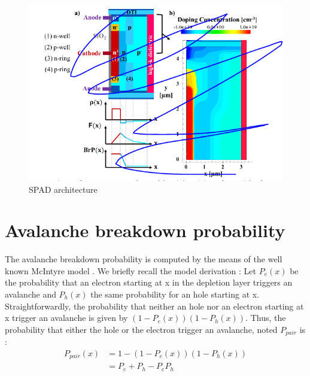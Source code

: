 \documentclass[10pt,a4paper,twocolumn]{article}
\begin{document}
\begin{figure}[hbtp]
\centering
\includegraphics[scale=0.80]{../pictures/SPAD_Archi.png}
\caption{SPAD architecture}
\end{figure}

\section{Avalanche breakdown probability}
The avalanche breakdown probability is computed by the means of the well known McIntyre model \cite{oldham_triggering_1972}. We briefly recall the model derivation : 
Let $P_e(x)$ be the probability that an electron starting at x in the depletion layer triggers an avalanche and $P_h(x)$ the same probability for an hole starting at x.
Straightforwardly, the probability that neither an hole nor an electron starting at x trigger an avalanche is given by $(1-P_e(x))(1-P_h(x))$.
Thus, the probability that either the hole or the electron trigger an avalanche, noted $P_{pair}$ is :
\begin{align*}
P_{pair}(x) &= 1 - \left( 1-P_e(x)\right)\left(1-P_h(x)\right)  \\
			&= P_e + P_h - P_e P_h
\end{align*}
\end{document}
